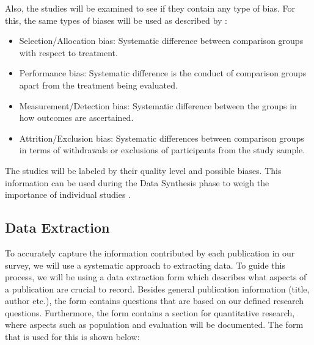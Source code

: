 \documentclass[]{book}
\providecommand{\tightlist}{%
  \setlength{\itemsep}{0pt}\setlength{\parskip}{0pt}}
\begin{document}
Also, the studies will be examined to see if they contain any type of
bias. For this, the same types of biases will be used as described by
\citet{kitchenham2004procedures}:

\begin{itemize}
\tightlist
\item
  Selection/Allocation bias: Systematic difference between comparison
  groups with respect to treatment.
\item
  Performance bias: Systematic difference is the conduct of comparison
  groups apart from the treatment being evaluated.
\item
  Measurement/Detection bias: Systematic difference between the groups
  in how outcomes are ascertained.
\item
  Attrition/Exclusion bias: Systematic differences between comparison
  groups in terms of withdrawals or exclusions of participants from the
  study sample.
\end{itemize}

The studies will be labeled by their quality level and possible biases.
This information can be used during the Data Synthesis phase to weigh
the importance of individual studies \citep{kitchenham2004procedures}.

\subsection{Data Extraction}\label{data-extraction}

To accurately capture the information contributed by each publication in
our survey, we will use a systematic approach to extracting data. To
guide this process, we will be using a data extraction form which
describes what aspects of a publication are crucial to record. Besides
general publication information (title, author etc.), the form contains
questions that are based on our defined research questions. Furthermore,
the form contains a section for quantitative research, where aspects
such as population and evaluation will be documented. The form that is
used for this is shown below:
\end{document}
